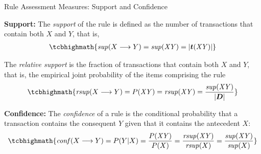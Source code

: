 
\date{Chapter 12: Pattern and Rule Assessment}

\begin{frame}
\titlepage
\end{frame}

\newcommand{\lift}{\mathit{lift}}
\newcommand{\leverage}{leverage}
\newcommand{\oddsratio}{oddsratio}
\newcommand{\jaccard}{jaccard}
\newcommand{\conviction}{conv}
\newcommand{\cover}{cover}
\newcommand{\productive}{productive}

\begin{frame}{Rule Assessment Measures: Support and Confidence}

{\bf Support:}
The {\em support} of the rule  is def\/{i}ned as the
number of transactions that contain both $X$ and $Y$, that is,
\begin{align*}
\tcbhighmath{
  \supp(X \arule Y) = \supp(\mathit{XY}) = \card{\vT(\mathit{XY})}
}
\end{align*}

\medskip
The {\em relative support} is
the fraction of transactions that contain both $X$
and $Y$, that is, the empirical
joint probability of the items comprising the rule
\begin{align*}
\tcbhighmath{
  \rsupp(X\arule Y) = P(\mathit{XY}) = \rsupp(\mathit{XY}) = \frac{\supp(\mathit{XY})}{\card{\bD}}
}
\end{align*}

\bigskip
{\bf Conf\/{i}dence:}
The {\em conf\/{i}dence} of a rule
is the conditional probability that
a transaction contains the consequent $Y$ given that it contains the
antecedent $X$:
\begin{align*}
\tcbhighmath{
\conff(X \arule Y) = P(Y|X) = \frac{P(\mathit{XY})}{P(X)} =
\frac{\rsupp(\mathit{XY})}{\rsupp (X)} =
\frac{\supp(\mathit{XY})}{\supp (X)}
}
\end{align*}
\end{frame}



